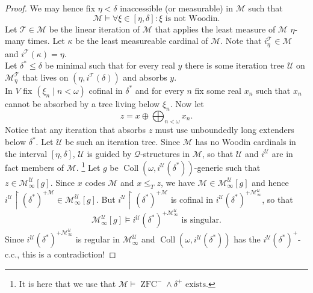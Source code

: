 \documentclass[12pt,a4paper]{article}
\theoremstyle{nicestyle}
\DeclareMathOperator{\zfc}{ZFC}
\DeclareMathOperator{\coll}{Coll}
\begin{document}
\begin{proof}
  We may hence fix $\eta < \delta$ inaccessible (or measurable) in
  $\mathcal{M}$ such that
  \[
    \mathcal{M} \models \forall \xi \in [\eta, \delta] \colon \xi
    \text{ is not Woodin}.
  \]
  Let $\mathcal{T} \in \mathcal{M}$ be the linear iteration of
  $\mathcal{M}$ that applies the least measure of $\mathcal{M}$
  $\eta$-many times. Let $\kappa$ be the least measureable cardinal of
  $\mathcal{M}$. Note that $i^{\mathcal{T}}_{\eta} \in \mathcal{M}$
  and $i^{\mathcal{T}}(\kappa) = \eta$. \\
  Let $\delta^{*} \le \delta$ be minimal such that for every real $y$
  there is some iteration tree $\mathcal{U}$ on
  $\mathcal{M}^{\mathcal{T}}_{\eta}$ that lives on
  $(\eta, i^{\mathcal{T}}(\delta))$ and absorbs $y$. \\
  In $V$ fix $(\xi_{n} \mid n < \omega)$ cofinal in $\delta^{*}$ and
  for every $n$ fix some real $x_{n}$ such that $x_{n}$ cannot be
  absorbed by a tree living below $\xi_{n}$. Now let
  \[
    z = x \oplus \bigoplus_{n < \omega} x_{n}.
  \]
  Notice that any iteration that absorbs $z$ must use unboundedly long
  extenders below $\delta^{*}$. Let $\mathcal{U}$ be such an iteration
  tree. Since $\mathcal{M}$ has no Woodin cardinals in the interval
  $[\eta, \delta]$, $\mathcal{U}$ is guided by
  $\mathcal{Q}$-structures in $\mathcal{M}$, so that $\mathcal{U}$ and
  $i^{\mathcal{U}}$ are in fact members of $\mathcal{M}$. \footnote{It
    is here that we use that
    $\mathcal{M} \models \zfc^{-} \wedge \delta^{+} \text{ exists}$.}
  Let $g$ be
  $\coll(\omega,i^{\mathcal{U}} (\delta^{*}))$-generic such
  that $z \in \mathcal{M}^{\mathcal{U}}_{\infty}[g]$. Since $x$ codes
  $\mathcal{M}$ and $x \le_{T} z$, we have
  $\mathcal{M} \in \mathcal{M}^{\mathcal{U}}_{\infty}[g]$ and hence
  $i^{\mathcal{U}} \restriction (\delta^{*})^{+\mathcal{M}} \in
  \mathcal{M}^{\mathcal{U}}_{\infty}[g]$. But
  $i^{\mathcal{U}} \restriction
  (\delta^{*})^{+\mathcal{M}}$ is cofinal in
  $i^{\mathcal{U}}(\delta^{*})^{+
    \mathcal{M}^{\mathcal{U}}_{\infty}}$, so that
  \[
    \mathcal{M}^{\mathcal{U}}_{\infty}[g] \models i^{\mathcal{U}}(\delta^{*})^{+
    \mathcal{M}^{\mathcal{U}}_{\infty}} \text{ is singular}.
  \]
  Since $i^{\mathcal{U}}(\delta^{*})^{+ \mathcal{M}^{\mathcal{U}}_{\infty}}$ is
    regular in $\mathcal{M}^{\mathcal{U}}_{\infty}$ and
    $\coll(\omega, i^{\mathcal{U}}(\delta^{*}))$ has the
    $i^{\mathcal{U}}(\delta^{*})^{+}$-c.c., this is a contradiction!
\end{proof}
\end{document}
